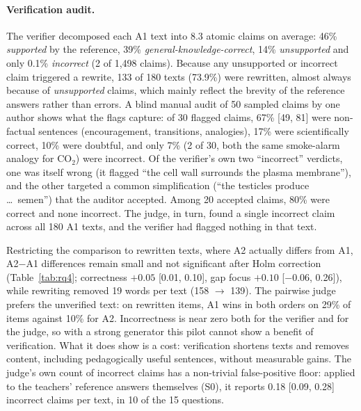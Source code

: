 \documentclass[11pt]{article}
\begin{document}
\paragraph{Verification audit.} The verifier decomposed each A1 text into 8.3 atomic claims on average: 46\% \emph{supported} by the reference, 39\% \emph{general-knowledge-correct}, 14\% \emph{unsupported} and only 0.1\% \emph{incorrect} (2 of 1{,}498 claims). Because any unsupported or incorrect claim triggered a rewrite, 133 of 180 texts (73.9\%) were rewritten, almost always because of \emph{unsupported} claims, which mainly reflect the brevity of the reference answers rather than errors. A blind manual audit of 50 sampled claims by one author shows what the flags capture: of 30 flagged claims, 67\% [49, 81] were non-factual sentences (encouragement, transitions, analogies), 17\% were scientifically correct, 10\% were doubtful, and only 7\% (2 of 30, both the same smoke-alarm analogy for CO$_2$) were incorrect. Of the verifier's own two ``incorrect'' verdicts, one was itself wrong (it flagged ``the cell wall surrounds the plasma membrane''), and the other targeted a common simplification (``the testicles produce \ldots\ semen'') that the auditor accepted. Among 20 accepted claims, 80\% were correct and none incorrect. The judge, in turn, found a single incorrect claim across all 180 A1 texts, and the verifier had flagged nothing in that text.

Restricting the comparison to rewritten texts, where A2 actually differs from A1, A2$-$A1 differences remain small and not significant after Holm correction (Table~\ref{tab:rq4}; correctness $+0.05$ [0.01, 0.10], gap focus $+0.10$ [$-$0.06, 0.26]), while rewriting removed 19 words per text (158 $\to$ 139). The pairwise judge prefers the unverified text: on rewritten items, A1 wins in both orders on 29\% of items against 10\% for A2. Incorrectness is near zero both for the verifier and for the judge, so with a strong generator this pilot cannot show a benefit of verification. What it does show is a cost: verification shortens texts and removes content, including pedagogically useful sentences, without measurable gains. The judge's own count of incorrect claims has a non-trivial false-positive floor: applied to the teachers' reference answers themselves (S0), it reports 0.18 [0.09, 0.28] incorrect claims per text, in 10 of the 15 questions.
\end{document}
